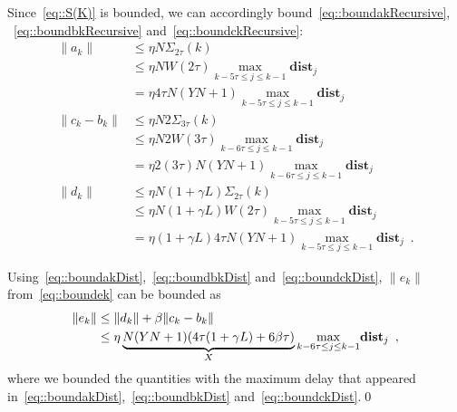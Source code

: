 \documentclass[envcountsect]{svjour3}
\newcommand{\dist}{{\mathbf{dist} }}
\begin{document}
 Since~\eqref{eq::S(K)} is bounded, we can accordingly bound~\eqref{eq::boundakRecursive}, ~\eqref{eq::boundbkRecursive} and~\eqref{eq::boundckRecursive}:
  \begin{subequations}
  \begin{alignat}{3}
  \|a_k\| \nonumber&\leq \eta N\Sigma_{2\tau}(k) \\
          \nonumber&\leq \eta NW(2\tau) \underset{k-5\tau \leq j \leq k-1}{\max}\dist_j \\
                   &= \eta 4\tau N(YN+1) \underset{k-5\tau \leq j \leq k-1}{\max}\dist_j\label{eq::boundakDist}\\
  \|c_k-b_k\| \nonumber&\leq \eta N2\Sigma_{3\tau}(k) \\
              \nonumber&\leq \eta  N2W(3\tau)\underset{k-6\tau \leq j \leq k-1}{\max}\dist_j \\
                       &= \eta 2(3\tau)N(YN+1) \underset{k-6\tau \leq j \leq k-1}{\max}\dist_j \label{eq::boundbkDist}\\
  \|d_k\| \nonumber&\leq \eta N(1+\gamma L)\Sigma_{2\tau}(k) \\
          \nonumber&\leq \eta N(1+\gamma L)W(2\tau)\underset{k-5\tau \leq j \leq k-1}{\max}\dist_j \\
                   &= \eta(1+\gamma L)4\tau N(YN+1)\underset{k-5\tau \leq j \leq k-1}{\max}\dist_j\enspace. \label{eq::boundckDist}
 \end{alignat}
\end{subequations}

Using~\eqref{eq::boundakDist},~\eqref{eq::boundbkDist} and~\eqref{eq::boundckDist}, $\|e_k\|$ from~\eqref{eq::boundek} can be bounded as
\begin{align}{\label{eq::boundekDist}}
 \|e_k\| \nonumber&\leq \|d_k\| + \beta\|c_k-b_k\| \\
                  &\leq \eta \underbrace{N(YN+1)(4\tau(1+\gamma L)+6\beta\tau)}_{X}\underset{k-6\tau \leq j \leq k-1}{\max}\dist_j\enspace,
\end{align}
where we bounded the quantities with the maximum delay that appeared in~\eqref{eq::boundakDist},~\eqref{eq::boundbkDist} and~\eqref{eq::boundckDist}.\qed

\end{document}
